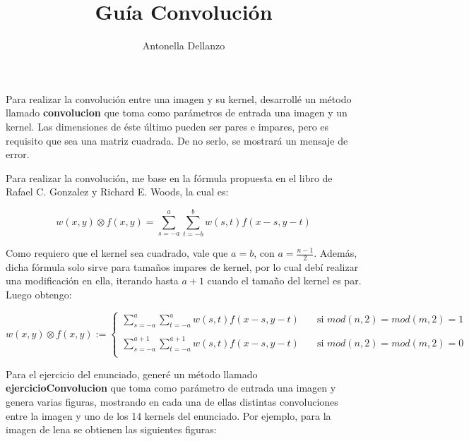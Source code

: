 \documentclass{article}
\begin{document}
\author{Antonella Dellanzo}
\title{Guía Convolución}
\date{}
\maketitle

Para realizar la convolución entre una imagen y su kernel, desarrollé un método llamado \textbf{convolucion} que toma como parámetros de entrada una imagen y un kernel. Las dimensiones de éste último pueden ser pares e impares, pero es requisito que sea una matriz cuadrada. De no serlo, se mostrará un mensaje de error.

Para realizar la convolución, me base en la fórmula propuesta en el libro de Rafael C. Gonzalez y Richard E. Woods\cite{libro}, la cual es:

\begin{equation}
w(x,y)\otimes f(x,y) = \sum_{s=-a}^{a} \sum_{t = -b}^{b} w(s,t)f(x-s,y-t)
\end{equation}

Como requiero que el kernel sea cuadrado, vale que $a=b$, con $a=\frac{n-1}{2}$. Además, dicha fórmula solo sirve para tamaños impares de kernel, por lo cual debí realizar una modificación en ella, iterando hasta $a+1$ cuando el tamaño del kernel es par. Luego obtengo:

\[   
w(x,y)\otimes f(x,y) := 
     \begin{cases}
        \sum_{s=-a}^{a} \sum_{t = -a}^{a} w(s,t)f(x-s,y-t) &\quad\text{si } mod(n,2) = mod(m,2) = 1\\
        \\
        \sum_{s=-a}^{a+1} \sum_{t = -a}^{a+1} w(s,t)f(x-s,y-t) &\quad\text{si } mod(n,2) = mod(m,2) = 0\\
     \end{cases}
\]

Para el ejercicio del enunciado, generé un método llamado \textbf{ejercicioConvolucion} que toma como parámetro de entrada una imagen y genera varias figuras, mostrando en cada una de ellas distintas convoluciones entre la imagen y uno de los 14 kernels del enunciado. Por ejemplo, para la imagen de lena se obtienen las siguientes figuras:
\end{document}
